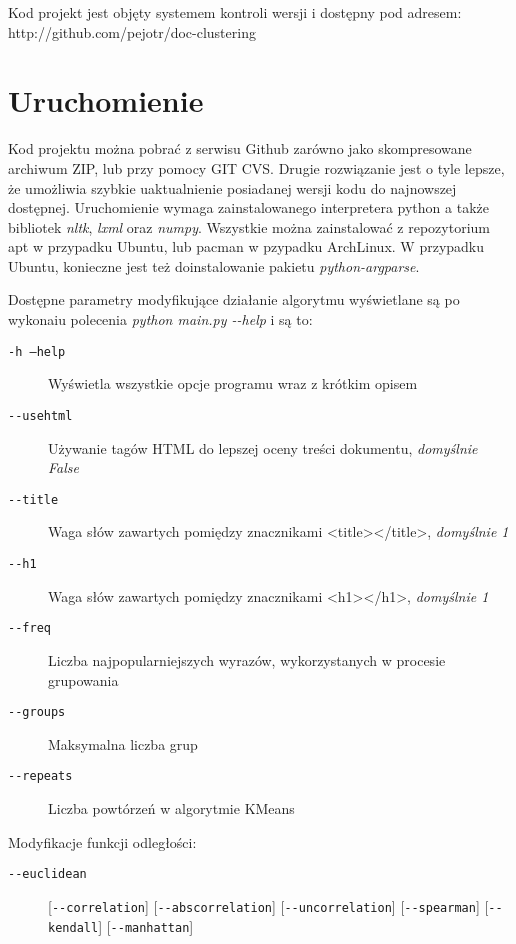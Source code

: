 \documentclass{article}
\begin{document}
Kod projekt jest objęty systemem kontroli wersji i dostępny pod adresem: http://github.com/pejotr/doc-clustering

\section{Uruchomienie}
Kod projektu można pobrać z serwisu Github zarówno jako skompresowane archiwum ZIP, lub przy pomocy GIT CVS. Drugie rozwiązanie jest o tyle lepsze, że umożliwia szybkie uaktualnienie posiadanej wersji kodu do najnowszej dostępnej. Uruchomienie wymaga zainstalowanego interpretera python a także bibliotek \emph{nltk}, \emph{lxml} oraz \emph{numpy}. Wszystkie można zainstalować z repozytorium apt w przypadku Ubuntu, lub pacman w pzypadku ArchLinux. W przypadku Ubuntu, konieczne jest też doinstalowanie pakietu \emph{python-argparse}.

Dostępne parametry modyfikujące działanie algorytmu wyświetlane są po wykonaiu polecenia \emph{python main.py -{}-help} i są to:
\begin{description}
\item [\texttt{-h --help}] Wyświetla wszystkie opcje programu wraz z krótkim opisem
\item [\texttt{-{}-usehtml}] Używanie tagów HTML do lepszej oceny treści dokumentu, \emph{domyślnie False}
\item [\texttt{-{}-title}] Waga słów zawartych pomiędzy znacznikami <title></title>, \emph{domyślnie 1}
\item [\texttt{-{}-h1}] Waga słów zawartych pomiędzy znacznikami <h1></h1>, \emph{domyślnie 1}
\item [\texttt{-{}-freq}] Liczba najpopularniejszych wyrazów, wykorzystanych w procesie grupowania
\item [\texttt{-{}-groups}] Maksymalna liczba grup
\item [\texttt{-{}-repeats}] Liczba powtórzeń w algorytmie KMeans
\end{description}

Modyfikacje funkcji odległości:
\begin{description}
\item [\texttt{-{}-euclidean}] [\texttt{-{}-correlation}] [\texttt{-{}-abscorrelation}] [\texttt{-{}-uncorrelation}] [\texttt{-{}-spearman}] [\texttt{-{}-kendall}] [\texttt{-{}-manhattan}]
\end{description}
\end{document}
